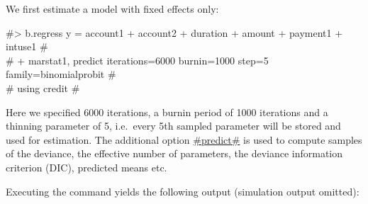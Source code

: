 We first estimate a model with fixed effects only:

#> b.regress  y = account1 + account2 + duration + amount + payment1 + intuse1 #\\
#  + marstat1, predict iterations=6000 burnin=1000 step=5 family=binomialprobit # \\
#  using credit #

Here we specified 6000 iterations, a burnin period of 1000
iterations and a thinning parameter of 5, i.e.~every 5th sampled
parameter will be stored and used for estimation. The additional
option \hyperref[predict]{#predict#} is used to compute samples of
the deviance, the effective number of parameters, the deviance
information criterion (DIC), predicted means etc.

Executing the command yields the following output (simulation output
omitted):

\small

